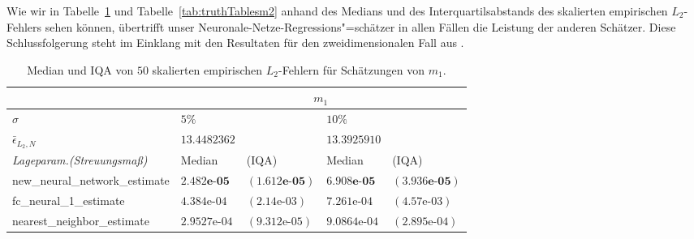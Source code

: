 
Wie wir in Tabelle~\ref{tab:truthTablesm1} und Tabelle~\ref{tab:truthTablesm2} anhand des Medians und des Interquartilsabstands des skalierten empirischen $L_2$-Fehlers sehen können, übertrifft unser Neuronale-Netze-Regressions"=schätzer in allen Fällen die Leistung der anderen Schätzer. Diese Schlussfolgerung steht im Einklang mit den Resultaten für den zweidimensionalen Fall aus \cite[Table 1]{kohler19}.
\begin{table}
\centering
\begin{tabular}{ |p{5cm}||p{1.7cm} p{2cm}|p{1.7cm} p{2cm}|}
 \hline
 & \multicolumn{4}{|c|}{$m_1$}\\
 \hline
 $\sigma$& $5\%$& & $10\%$ &\\
 \hline
 $\bar{\epsilon}_{L_2,N}$& $13.4482362$ & & $13.3925910$ & \\
 \hline
 \textit{Lageparam.\@ (Streuungsmaß) }&  Median &(IQA) &  Median &(IQA)   \\
 \hline
new\_neural\_network\_estimate & $\mathbf{2.482\textbf{e-}05}$& $\mathbf{(1.612\textbf{e-}05)}$   & $\mathbf{6.908\textbf{e-}05}$&$\mathbf{ (3.936\textbf{e-}05)}$  \\
 fc\_neural\_1\_estimate & $4.384\text{e-}04$&$(2.14\text{e-}03)$ &   $7.261\text{e-}04$&$(4.57\text{e-}03)$ \\
 nearest\_neighbor\_estimate & $2.9527\text{e-}04$&$(9.312\text{e-}05)$ & $9.0864\text{e-}04$&$(2.895\text{e-}04)$\\
 \hline
\end{tabular}
    \caption{Median und IQA von $50$ skalierten empirischen $L_2$-Fehlern für Schätzungen von $m_1$.}
     \label{tab:truthTablesm1}   
\end{table}

